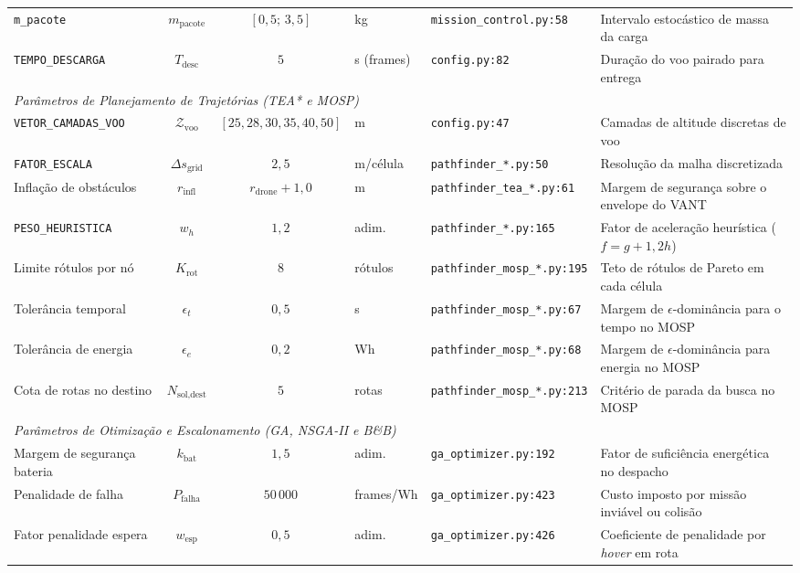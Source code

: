 \begin{table}[htbp]
\begin{tabular}{p{3.2cm}ccp{1.2cm}p{3.2cm}p{3.8cm}}
\texttt{m\_pacote} & $m_{\text{pacote}}$ & $[0{,}5;\,3{,}5]$ & kg & \texttt{mission\_control.py:58} & Intervalo estocástico de massa da carga \\
\texttt{TEMPO\_DESCARGA} & $T_{\text{desc}}$ & $5$ & s (frames) & \texttt{config.py:82} & Duração do voo pairado para entrega \\
\midrule
\multicolumn{6}{l}{\textit{Parâmetros de Planejamento de Trajetórias (TEA* e MOSP)}} \\
\texttt{VETOR\_CAMADAS\_VOO} & $\mathcal{Z}_{\text{voo}}$ & $[25, 28, 30, 35, 40, 50]$ & m & \texttt{config.py:47} & Camadas de altitude discretas de voo \\
\texttt{FATOR\_ESCALA} & $\Delta s_{\text{grid}}$ & $2{,}5$ & m/célula & \texttt{pathfinder\_*.py:50} & Resolução da malha discretizada \\
Inflação de obstáculos & $r_{\text{infl}}$ & $r_{\text{drone}} + 1{,}0$ & m & \texttt{pathfinder\_tea\_*.py:61} & Margem de segurança sobre o envelope do VANT \\
\texttt{PESO\_HEURISTICA} & $w_h$ & $1{,}2$ & adim. & \texttt{pathfinder\_*.py:165} & Fator de aceleração heurística ($f = g + 1{,}2 h$) \\
Limite rótulos por nó & $K_{\text{rot}}$ & $8$ & rótulos & \texttt{pathfinder\_mosp\_*.py:195} & Teto de rótulos de Pareto em cada célula \\
Tolerância temporal & $\epsilon_t$ & $0{,}5$ & s & \texttt{pathfinder\_mosp\_*.py:67} & Margem de $\epsilon$-dominância para o tempo no MOSP \\
Tolerância de energia & $\epsilon_e$ & $0{,}2$ & Wh & \texttt{pathfinder\_mosp\_*.py:68} & Margem de $\epsilon$-dominância para energia no MOSP \\
Cota de rotas no destino & $N_{\text{sol,dest}}$ & $5$ & rotas & \texttt{pathfinder\_mosp\_*.py:213} & Critério de parada da busca no MOSP \\
\midrule
\multicolumn{6}{l}{\textit{Parâmetros de Otimização e Escalonamento (GA, NSGA-II e B\&B)}} \\
Margem de segurança bateria & $k_{\text{bat}}$ & $1{,}5$ & adim. & \texttt{ga\_optimizer.py:192} & Fator de suficiência energética no despacho \\
Penalidade de falha & $P_{\text{falha}}$ & $50\,000$ & frames/Wh & \texttt{ga\_optimizer.py:423} & Custo imposto por missão inviável ou colisão \\
Fator penalidade espera & $w_{\text{esp}}$ & $0{,}5$ & adim. & \texttt{ga\_optimizer.py:426} & Coeficiente de penalidade por \textit{hover} em rota \\

\end{tabular}
\end{table}
